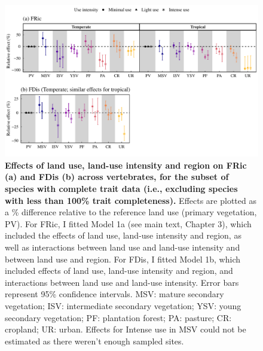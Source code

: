 \begin{figure}[h!]
\centering
\includegraphics[scale=0.7]{Supporting/Chapter3/Figures/SI_Figure18}
\caption[Effects of land use, land-use intensity and region on FRic (a) and FDis (b) across vertebrates, for the subset of species with complete trait data]{\textbf{Effects of land use, land-use intensity and region on FRic (a) and FDis (b) across vertebrates, for the subset of species with complete trait data (i.e., excluding species with less than 100\% trait completeness).} Effects are plotted as a \% difference relative to the reference land use (primary vegetation, PV). For FRic, I fitted Model 1a (see main text, Chapter 3), which included the effects of land use, land-use intensity and region, as well as interactions between land use and land-use intensity and between land use and region. For FDis, I fitted Model 1b, which included effects of land use, land-use intensity and region, and interactions between land use and land-use intensity. Error bars represent 95\% confidence intervals. MSV: mature secondary vegetation; ISV: intermediate secondary vegetation; YSV: young secondary vegetation; PF: plantation forest; PA: pasture; CR: cropland; UR: urban. Effects for Intense use in MSV could not be estimated as there weren’t enough sampled sites.}
\label{SI3_F18}
\end{figure}

